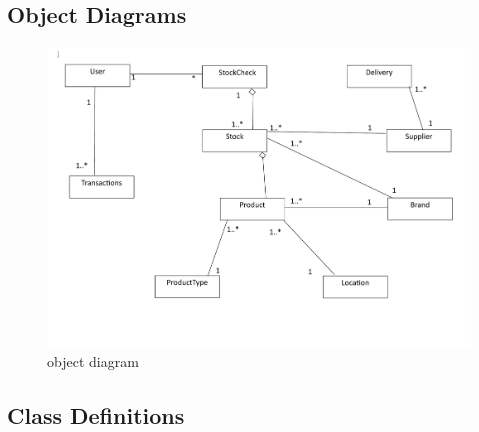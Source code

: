 \subsection{Object Diagrams}

\begin{figure}[H]
    \includegraphics[width=\textwidth]{./Design/pdfimages/object_diagram.pdf}
    \caption{object diagram} \label{fig:object diagram}
\end{figure}

\subsection{Class Definitions}


